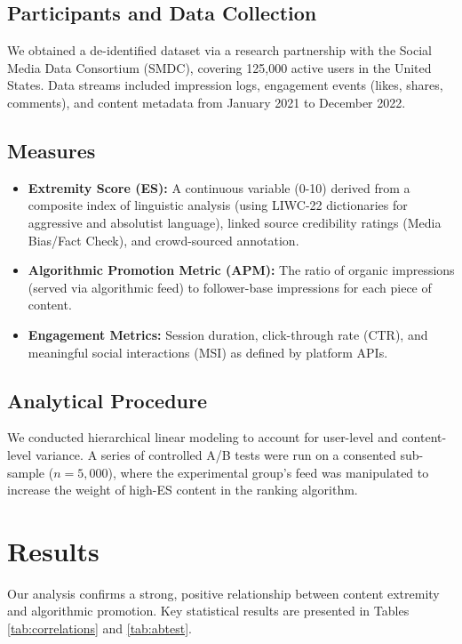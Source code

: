 \documentclass[12pt]{article}
\begin{document}
\subsection{Participants and Data Collection}
We obtained a de-identified dataset via a research partnership with the Social Media Data Consortium (SMDC), covering 125,000 active users in the United States. Data streams included impression logs, engagement events (likes, shares, comments), and content metadata from January 2021 to December 2022.

\subsection{Measures}
\begin{itemize}
    \item \textbf{Extremity Score (ES):} A continuous variable (0-10) derived from a composite index of linguistic analysis (using LIWC-22 dictionaries for aggressive and absolutist language), linked source credibility ratings (Media Bias/Fact Check), and crowd-sourced annotation.
    \item \textbf{Algorithmic Promotion Metric (APM):} The ratio of organic impressions (served via algorithmic feed) to follower-base impressions for each piece of content.
    \item \textbf{Engagement Metrics:} Session duration, click-through rate (CTR), and meaningful social interactions (MSI) as defined by platform APIs.
\end{itemize}

\subsection{Analytical Procedure}
We conducted hierarchical linear modeling to account for user-level and content-level variance. A series of controlled A/B tests were run on a consented sub-sample ($n=5,000$), where the experimental group's feed was manipulated to increase the weight of high-ES content in the ranking algorithm.

\section{Results}
Our analysis confirms a strong, positive relationship between content extremity and algorithmic promotion. Key statistical results are presented in Tables \ref{tab:correlations} and \ref{tab:abtest}.

\end{document}

